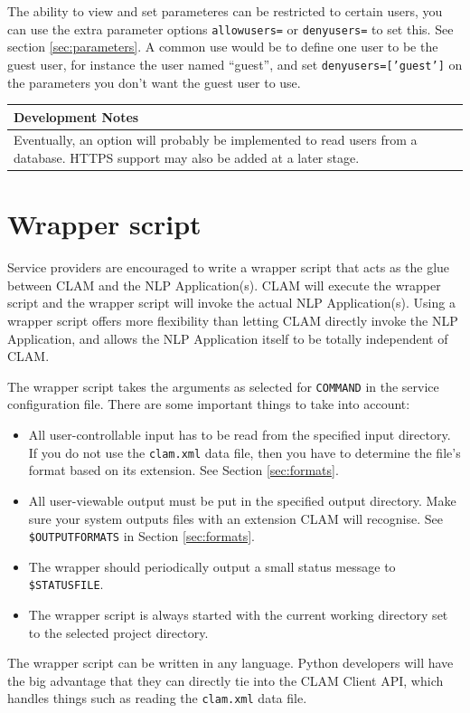 \documentclass[a4paper,12pt]{report}
\newenvironment{devnotes}
{\newpage
\begin{center}
    \begin{tabular}[h!]{|p{0.8\textwidth}|}
    \hline
    {\bf Development Notes}\\\hline}
{   \\\hline
    \end{tabular}
\end{center}}
\begin{document}
The ability to view and set parameteres can be restricted to certain users, you can use the extra parameter options \texttt{allowusers=} or \texttt{denyusers=} to set this. See section \ref{sec:parameters}. A common use would be to define one user to be the guest user, for instance the user named ``guest'', and set \texttt{denyusers=['guest']} on the parameters you don't want the guest user to use.

\begin{devnotes}
Eventually, an option will probably be implemented to read users from a database. HTTPS support may also be added at a later stage.
\end{devnotes}

\section{Wrapper script}

Service providers are encouraged to write a wrapper script that acts as the glue between CLAM and the NLP Application(s). CLAM will execute the wrapper script and the wrapper script will invoke the actual NLP Application(s). Using a wrapper script offers more flexibility than letting CLAM directly invoke the NLP Application, and allows the NLP Application itself to be totally independent of CLAM. 

The wrapper script takes the arguments as selected for \texttt{COMMAND} in the service configuration file. There are some important things to take into account:

\begin{itemize}
\item All user-controllable input has to be read from the specified input directory. If you do not use the \texttt{clam.xml} data file, then you have to determine the file's format based on its extension. See Section \ref{sec:formats}.
\item All user-viewable output must be put in the specified output directory. Make sure your system outputs files with an extension CLAM will recognise. See \texttt{\$OUTPUTFORMATS} in Section \ref{sec:formats}.
\item The wrapper should periodically output a small status message to \texttt{\$STATUSFILE}. 
\item The wrapper script is always started with the current working directory set to the selected project directory.
\end{itemize}

The wrapper script can be written in any language. Python developers will have the big advantage that they can directly tie into the CLAM Client API, which handles things such as reading the \texttt{clam.xml} data file.
\end{document}

